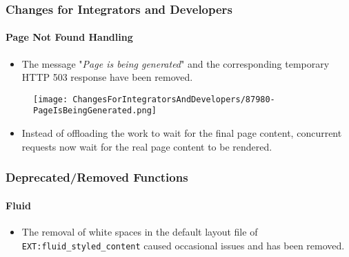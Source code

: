 
\begin{frame}[fragile]
	\frametitle{Changes for Integrators and Developers}
	\framesubtitle{Page Not Found Handling}

	\begin{itemize}

		\item The message "\textit{Page is being generated}" and the corresponding temporary
			HTTP 503 response have been removed.
	\end{itemize}

	\begin{figure}
		\texttt{[image: ChangesForIntegratorsAndDevelopers/87980-PageIsBeingGenerated.png]}
	\end{figure}

	\begin{itemize}
		\item Instead of offloading the work to wait for the final page content, concurrent
			requests now wait for the real page content to be rendered.
	\end{itemize}

\end{frame}


\begin{frame}[fragile]
	\frametitle{Deprecated/Removed Functions}
	\framesubtitle{Fluid}

	\begin{itemize}
		\item The removal of white spaces in the default layout file of \texttt{EXT:fluid\_styled\_content}
			caused occasional issues and has been removed.

	\end{itemize}

\end{frame}


